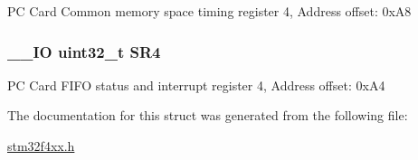 P\-C Card Common memory space timing register 4, Address offset\-: 0x\-A8 \hypertarget{struct_f_s_m_c___bank4___type_def_a8218d6e11dae5d4468c69303dec0b4fc}{
\subsubsection[{S\-R4}]{\setlength{\rightskip}{0pt plus 5cm}\-\_\-\-\_\-\-I\-O uint32\-\_\-t S\-R4}}\label{struct_f_s_m_c___bank4___type_def_a8218d6e11dae5d4468c69303dec0b4fc}
P\-C Card F\-I\-F\-O status and interrupt register 4, Address offset\-: 0x\-A4 

The documentation for this struct was generated from the following file\-:\begin{DoxyCompactItemize}
\item 
\hyperlink{stm32f4xx_8h}{stm32f4xx.\-h}\end{DoxyCompactItemize}
